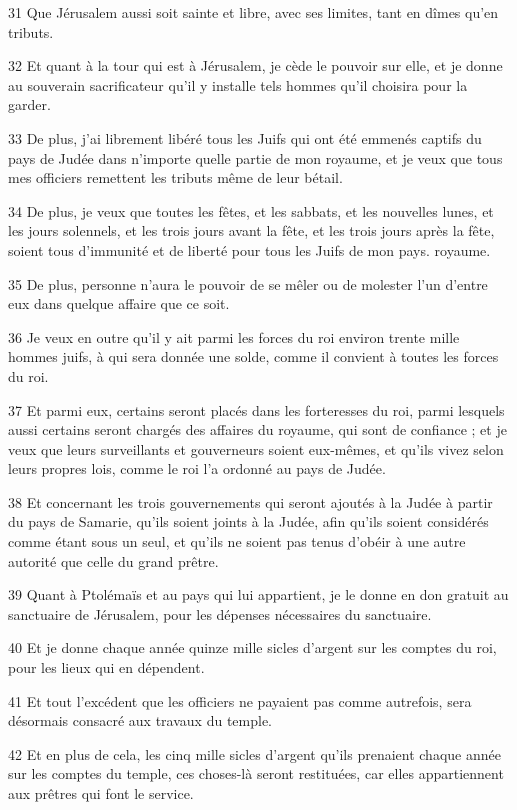 \par 31 Que Jérusalem aussi soit sainte et libre, avec ses limites, tant en dîmes qu'en tributs.
\par 32 Et quant à la tour qui est à Jérusalem, je cède le pouvoir sur elle, et je donne au souverain sacrificateur qu'il y installe tels hommes qu'il choisira pour la garder.
\par 33 De plus, j'ai librement libéré tous les Juifs qui ont été emmenés captifs du pays de Judée dans n'importe quelle partie de mon royaume, et je veux que tous mes officiers remettent les tributs même de leur bétail.
\par 34 De plus, je veux que toutes les fêtes, et les sabbats, et les nouvelles lunes, et les jours solennels, et les trois jours avant la fête, et les trois jours après la fête, soient tous d'immunité et de liberté pour tous les Juifs de mon pays. royaume.
\par 35 De plus, personne n'aura le pouvoir de se mêler ou de molester l'un d'entre eux dans quelque affaire que ce soit.
\par 36 Je veux en outre qu'il y ait parmi les forces du roi environ trente mille hommes juifs, à qui sera donnée une solde, comme il convient à toutes les forces du roi.
\par 37 Et parmi eux, certains seront placés dans les forteresses du roi, parmi lesquels aussi certains seront chargés des affaires du royaume, qui sont de confiance ; et je veux que leurs surveillants et gouverneurs soient eux-mêmes, et qu'ils vivez selon leurs propres lois, comme le roi l'a ordonné au pays de Judée.
\par 38 Et concernant les trois gouvernements qui seront ajoutés à la Judée à partir du pays de Samarie, qu'ils soient joints à la Judée, afin qu'ils soient considérés comme étant sous un seul, et qu'ils ne soient pas tenus d'obéir à une autre autorité que celle du grand prêtre.
\par 39 Quant à Ptolémaïs et au pays qui lui appartient, je le donne en don gratuit au sanctuaire de Jérusalem, pour les dépenses nécessaires du sanctuaire.
\par 40 Et je donne chaque année quinze mille sicles d'argent sur les comptes du roi, pour les lieux qui en dépendent.
\par 41 Et tout l'excédent que les officiers ne payaient pas comme autrefois, sera désormais consacré aux travaux du temple.
\par 42 Et en plus de cela, les cinq mille sicles d'argent qu'ils prenaient chaque année sur les comptes du temple, ces choses-là seront restituées, car elles appartiennent aux prêtres qui font le service.
